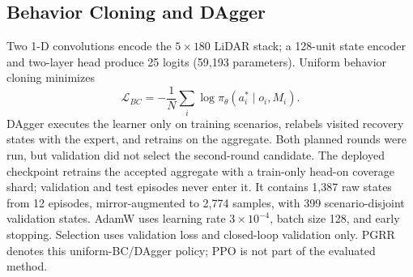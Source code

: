\subsection{Behavior Cloning and DAgger}
Two 1-D convolutions encode the $5\times180$ LiDAR stack; a 128-unit state
encoder and two-layer head produce 25 logits (59,193 parameters).  Uniform
behavior cloning minimizes
\begin{equation}
 \mathcal{L}_{BC}=-\frac{1}{N}\sum_i\log\pi_{\theta}(a_i^*\mid o_i,M_i).
\end{equation}
DAgger executes the learner only on training scenarios, relabels visited
recovery states with the expert, and retrains on the aggregate.  Both planned
rounds were run, but validation did not select the second-round candidate.  The
deployed checkpoint retrains the accepted aggregate with a train-only head-on
coverage shard; validation and test episodes never enter it.  It contains 1,387
raw states from 12 episodes, mirror-augmented to 2,774 samples, with 399
scenario-disjoint validation states.  AdamW uses learning rate
$3\times10^{-4}$, batch size 128, and early stopping.  Selection uses validation
loss and closed-loop validation only.  PGRR denotes this uniform-BC/DAgger
policy; PPO is not part of the evaluated method.
